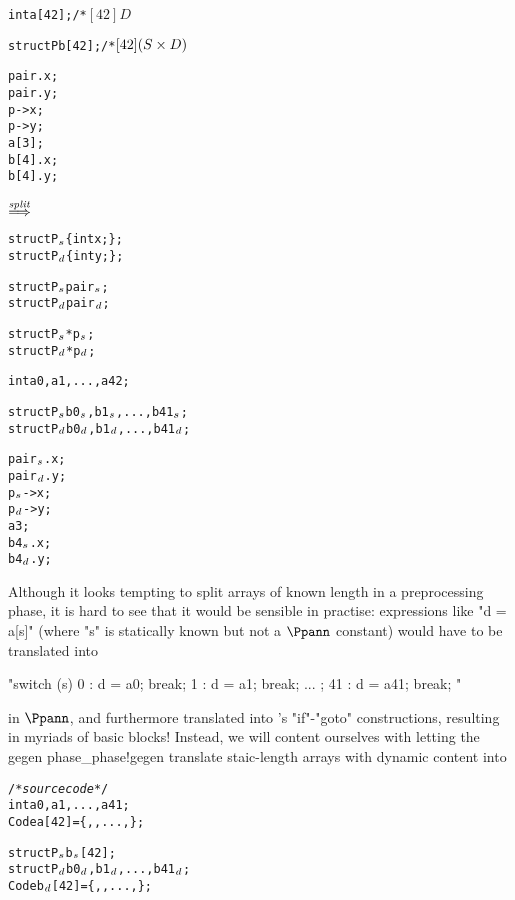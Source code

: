 \begin{docpart}
\begin{minipage}[c]{.45\textwidth}
\begin{alltt}
int a[42];              /*\rlap{\hspace{6em}*/} \([42]D\) 

struct P b[42];         /*\rlap{\hspace{6em}*/} \([42](S\x{D})\)


pair.x;
pair.y;
p->x;
p->y;
a[3];
b[4].x;
b[4].y;
\end{alltt}
\end{minipage}
\hfil
$\displaystyle\mathop{==>}\limits\sp{\mathit{split}}$
\hfil
\begin{minipage}[c]{.40\textwidth}
\begin{alltt}
struct P\(\sb{s}\) \{ int x; \};
struct P\(\sb{d}\) \{ int y; \};

struct P\(\sb{s}\) pair\(\sb{s}\);
struct P\(\sb{d}\) pair\(\sb{d}\);

struct P\(\sb{s}\) *p\(\sb{s}\);
struct P\(\sb{d}\) *p\(\sb{d}\);

int a0, a1, ..., a42;

struct P\(\sb{s}\) b0\(\sb{s}\), b1\(\sb{s}\), ..., b41\(\sb{s}\);
struct P\(\sb{d}\) b0\(\sb{d}\), b1\(\sb{d}\), ..., b41\(\sb{d}\);

pair\(\sb{s}\).x;
pair\(\sb{d}\).y;
p\(\sb{s}\)->x;
p\(\sb{d}\)->y;
a3;
b4\(\sb{s}\).x;
b4\(\sb{d}\).y;
\end{alltt}
\end{minipage}\medskip

Although it looks tempting to split arrays of known length in
a preprocessing phase, it is hard to see that it would be sensible
in practise: expressions like "d = a[s]" (where "s" is statically known but
not a $\Ppann$ constant) would have to be translated into
\begin{center}
"switch (s) { 0 : d = a0; break;  1 : d = a1; break;  ... ;  41 : d = a41; break; }"
\end{center}
in $\Ppann$, and furthermore translated into \coreC's
"if"-"goto" constructions, resulting in myriads of basic blocks! 
Instead,
we will content ourselves with letting the gegen phase_{phase!gegen}
translate staic-length arrays with dynamic content into
\begin{alltt}
/* \Ppgen \textnormal{\emph{source code}} */
int a0, a1, ..., a41;
Code a[42] = \{ , , ...,  \};

struct P\(\sb{s}\) b\(\sb{s}\)[42];
struct P\(\sb{d}\) b0\(\sb{d}\), b1\(\sb{d}\), ..., b41\(\sb{d}\);
Code b\(\sb{d}\)[42] = \{ , , ...,  \};


\end{alltt}
\end{docpart}
